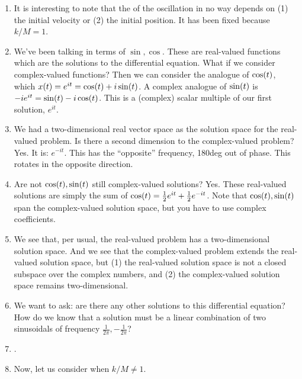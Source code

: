 \begin{enumerate}
  \item It is interesting to note that the  of the
  oscillation in no way depends on (1) the initial velocity or (2) the
  initial position. It has been fixed because $k/M = 1$.

  \item We've been talking in terms of $\sin, \cos$. These are
  real-valued functions which are the solutions to the differential
  equation. What if we consider complex-valued functions? Then we can
  consider the analogue of $\cos\mathopen{}\left( {t} \right)\mathclose{}$, which $x(t) = e^{it} = \cos\mathopen{}\left( {t} \right)\mathclose{} +
  i \sin\mathopen{}\left( {t} \right)\mathclose{}$. A complex analogue of $\sin\mathopen{}\left( {t} \right)\mathclose{}$ is $-i e^{it} = \sin\mathopen{}\left( {t} \right)\mathclose{}
  - i\cos\mathopen{}\left( {t} \right)\mathclose{}$. This is a (complex) scalar multiple of our first
  solution, $e^{it}$.

  \item We had a two-dimensional real vector space as the solution space
  for the real-valued problem. Is there a second dimension to the
  complex-valued problem? Yes. It is: $e^{-it}$. This has the
  ``opposite'' frequency, 180deg out of phase. This rotates in the
  opposite direction.

  \item Are not $\cos\mathopen{}\left( {t} \right)\mathclose{}, \sin\mathopen{}\left( {t} \right)\mathclose{}$ still complex-valued solutions?
  Yes. These real-valued solutions are simply the sum of $\cos\mathopen{}\left( {t} \right)\mathclose{} =
  \frac{1}{2} e^{it} + \frac{1}{2} e^{-it}$. Note that $\cos\mathopen{}\left( {t} \right)\mathclose{}, \sin\mathopen{}\left( {t} \right)\mathclose{}$ span the
  complex-valued solution space, but you have to use complex
  coefficients.

  \item We see that, per usual, the real-valued problem has a
  two-dimensional solution space. And we see that the complex-valued
  problem extends the real-valued solution space, but (1) the
  real-valued solution space is not a closed subspace over the complex
  numbers, and (2) the complex-valued solution space remains
  two-dimensional.

  \item We want to ask: are there any other solutions to this
  differential equation? How do we know that a solution must be a linear
  combination of two sinusoidals of frequency $\frac{1}{2\pi},
  -\frac{1}{2\pi}$?

  \item {}.

  \item Now, let us consider when $k/M \ne 1$.
\end{enumerate}
